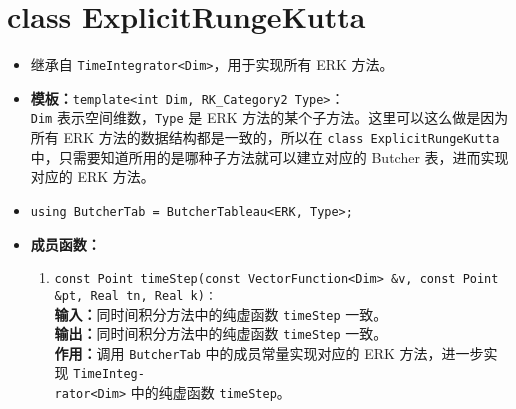 \documentclass[a4paper,twoside]{ctexart}
\begin{document}
\section{class ExplicitRungeKutta}
\begin{itemize}
    \item 继承自 \texttt{TimeIntegrator<Dim>}，用于实现所有 ERK 方法。
    \item \textbf{模板：}\texttt{template<int Dim, RK\_Category2 Type>}：\\\texttt{Dim} 表示空间维数，\texttt{Type} 是 ERK 方法的某个子方法。这里可以这么做是因为所有 ERK 方法的数据结构都是一致的，所以在 \texttt{class ExplicitRungeKutta} 中，只需要知道所用的是哪种子方法就可以建立对应的 Butcher 表，进而实现对应的 ERK 方法。
    \item \texttt{using ButcherTab = ButcherTableau<ERK, Type>;}
    \item \textbf{成员函数：}
            \begin{enumerate}[(1)]
                \item \texttt{const Point timeStep(const VectorFunction<Dim> \&v, const Point \&pt, Real tn, Real k)：}\\
                \textbf{输入：}同时间积分方法中的纯虚函数 \texttt{timeStep} 一致。\\
                \textbf{输出：}同时间积分方法中的纯虚函数 \texttt{timeStep} 一致。\\
                \textbf{作用：}调用 \texttt{ButcherTab} 中的成员常量实现对应的 ERK 方法，进一步实现 \texttt{TimeInteg-\\rator<Dim>} 中的纯虚函数 \texttt{timeStep}。
            \end{enumerate}
\end{itemize}
\end{document}
